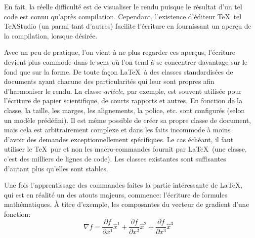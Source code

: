 	En fait, la réelle difficulté est de visualiser le rendu puisque le résultat d'un tel code est connu qu'après compilation. Cependant, l'existence d'éditeur \TeX~tel TeXStudio (un parmi tant d'autres) facilite l'écriture en fournissant un aperçu de la compilation, lorsque désirée.
	\par Avec un peu de pratique, l'on vient à ne plus regarder ces aperçus, l'écriture devient plus commode dans le sens où l'on tend à se concentrer davantage sur le fond que sur la forme. De toute façon \LaTeX~à des classes standardisées de documents ayant chacune des particularités qui leur sont propres afin d'harmoniser le rendu. La classe \textit{article}, par exemple, est souvent utilisée pour l'écriture de papier scientifique, de courts rapports et autres. En fonction de la classe, la taille, les marges, les alignements, la police, etc. sont configurés (selon un modèle prédéfini). Il est même possible de créer sa propre classe de document, mais cela est arbitrairement complexe et dans les faits incommode à moins d'avoir des demandes exceptionnellement spécifiques. Le cas échéant, il faut utiliser le \TeX~pur et non les macro-commandes fournit par \LaTeX~(une classe, c'est des milliers de lignes de code). Les classes existantes sont suffisantes d'autant plus qu'elles sont stables. 
	\par Une fois l'apprentissage des commandes faites la partie intéressante de \LaTeX, qui est en réalité un des atouts majeurs, commence: l'écriture de formules mathématiques. À titre d'exemple, les composantes du vecteur de gradient d'une fonction:
	\begin{equation}\label{eq:exemple}
	\nabla f =%
	\frac{\partial f}{\partial x^1}\widehat{x}^1%
	+\frac{\partial f}{\partial x^2}\widehat{x}^2%
	+\frac{\partial f}{\partial x^3}\widehat{x}^3
	\end{equation}
